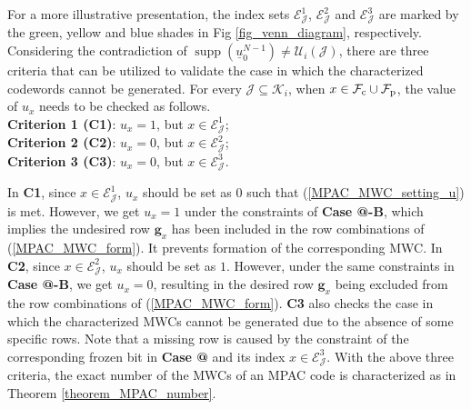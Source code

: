 \documentclass[12pt, draftclsnofoot, peerreview, onecolumn]{IEEEtran}
\makeatletter
\theoremstyle{noparent}
\newcommand{\Rmnum}[1]{\expandafter\@slowromancap\romannumeral #1@}
\DeclareMathOperator\supp{supp}
\makeatother
\begin{document}
For a more illustrative presentation, the index sets 
$\mathcal{E}_{\mathcal{J}}^{1}$, $\mathcal{E}_{\mathcal{J}}^{2}$ and $\mathcal{E}_{\mathcal{J}}^{3}$ are 
marked by the green, yellow and blue shades
in Fig \ref{fig_venn_diagram}, respectively.
Considering the contradiction of $\supp({\underline{u}_0^{N-1}})\neq \mathcal{U}_i(\mathcal{J})$,
there are three criteria that can be utilized to validate the case
in which the characterized codewords cannot be generated.
For every $\mathcal{J}\subseteq\mathcal{K}_i$, when $x\in \mathcal{F}_{\rm c}\cup \mathcal{F}_{\rm p}$, the value of $u_x$ 
needs to be checked as follows.\\
\indent\textbf{Criterion 1 (C1)}: $u_x=1$, but $x\in \mathcal{E}_{\mathcal{J}}^{1}$;\\
\indent\textbf{Criterion 2 (C2)}: $u_x=0$, but $x\in \mathcal{E}_{\mathcal{J}}^{2}$;\\
\indent\textbf{Criterion 3 (C3)}: $u_x=0$, but $x\in \mathcal{E}_{\mathcal{J}}^{3}$.

In \textbf{C1}, since $x\in \mathcal{E}_{\mathcal{J}}^{1}$, $u_x$ should be set 
as $0$ such that (\ref{MPAC_MWC_setting_u}) is met. 
However, we get $u_x=1$ under the constraints of 
\textbf{Case \Rmnum{1}-B}, 
which implies the undesired row $\mathbf{g}_x$ has been included in the 
row combinations of (\ref{MPAC_MWC_form}).
It prevents formation of the corresponding MWC.
In \textbf{C2}, since $x\in \mathcal{E}_{\mathcal{J}}^{2}$, $u_x$ should be set as $1$.
However, under the same constraints in \textbf{Case \Rmnum{1}-B}, 
we get $u_x=0$, resulting in 
the desired row $\mathbf{g}_x$ being excluded from the row combinations of (\ref{MPAC_MWC_form}).
\textbf{C3} also checks the case in which the characterized MWCs
cannot be generated due to the absence of some specific rows.
Note that a missing row is caused by the constraint
of the corresponding frozen bit in \textbf{Case \Rmnum{3}}
and its index $x\in \mathcal{E}_{\mathcal{J}}^{3}$.
With the above three criteria, 
the exact number of the MWCs of an MPAC code is characterized as in 
Theorem \ref{theorem_MPAC_number}.
\end{document}

